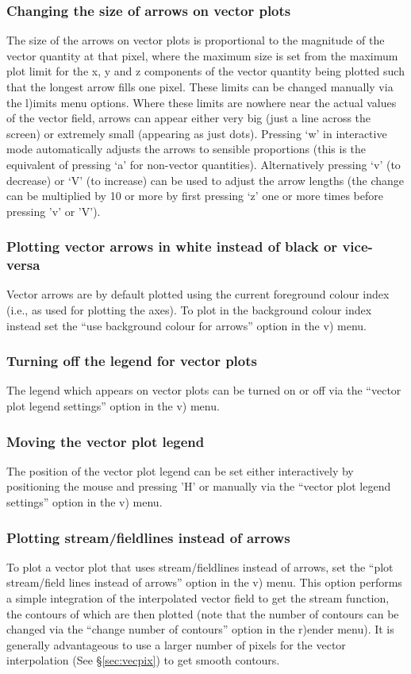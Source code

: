 \documentclass[a4paper,10pt]{article}
\begin{document}
\subsubsection{ Changing the size of arrows on vector plots}
 The size of the arrows on vector plots is proportional to the magnitude of the vector quantity at that pixel, where the maximum size is set from the maximum plot limit for the x, y and z components of the vector quantity being plotted such that the longest arrow fills one pixel. These limits can be changed manually via the l)imits menu options. Where these limits are nowhere near the actual values of the vector field, arrows can appear either very big (just a line across the screen) or extremely small (appearing as just dots). Pressing `w' in interactive mode automatically adjusts the arrows to sensible proportions (this is the equivalent of pressing `a' for non-vector quantities). Alternatively pressing `v' (to decrease) or `V' (to increase) can be used to adjust the arrow lengths (the change can be multiplied by 10 or more by first pressing `z' one or more times before pressing 'v' or 'V').

\subsubsection{ Plotting vector arrows in white instead of black or vice-versa}
 Vector arrows are by default plotted using the current foreground colour index (i.e., as used for plotting the axes). To plot in the background colour index instead set the ``use background colour for arrows'' option in the v) menu.

\subsubsection{ Turning off the legend for vector plots}
 The legend which appears on vector plots can be turned on or off via the ``vector plot legend settings'' option in the v) menu.

\subsubsection{ Moving the vector plot legend}
 The position of the vector plot legend can be set either interactively by positioning the mouse and pressing 'H' or manually via the ``vector plot legend settings'' option in the v) menu.

\subsubsection{ Plotting stream/fieldlines instead of arrows}
 To plot a vector plot that uses stream/fieldlines instead of arrows, set the ``plot stream/field lines instead of arrows'' option in the v) menu. This option performs a simple integration of the interpolated vector field to get the stream function, the contours of which are then plotted (note that the number of contours can be changed via the ``change number of contours'' option in the r)ender menu). It is generally advantageous to use a larger number of pixels for the vector interpolation (See \S\ref{sec:vecpix}) to get smooth contours.
 
\end{document}
